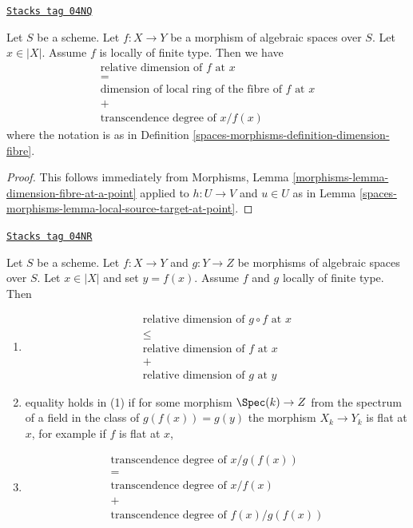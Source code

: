 \begin{lemma}
\label{spaces-morphisms-lemma-dimension-fibre-at-a-point}
\href{https://stacks.math.columbia.edu/tag/04NQ}{\texttt{Stacks tag 04NQ}}

Let $S$ be a scheme.
Let $f : X \to Y$ be a morphism of algebraic spaces over $S$.
Let $x \in |X|$.
Assume $f$ is locally of finite type.
Then we have
$$
\begin{matrix}
\text{relative dimension of }f\text{ at }x \\
= \\
\text{dimension of local ring of the fibre of }f\text{ at }x \\
+ \\
\text{transcendence degree of }x/f(x)
\end{matrix}
$$
where the notation is as in
Definition \ref{spaces-morphisms-definition-dimension-fibre}.
\end{lemma}

\begin{proof}
This follows immediately from
Morphisms, Lemma \ref{morphisms-lemma-dimension-fibre-at-a-point}
applied to $h : U \to V$ and $u \in U$
as in
Lemma \ref{spaces-morphisms-lemma-local-source-target-at-point}.
\end{proof}

\begin{lemma}
\label{spaces-morphisms-lemma-dimension-fibre-at-a-point-additive}
\href{https://stacks.math.columbia.edu/tag/04NR}{\texttt{Stacks tag 04NR}}

Let $S$ be a scheme.
Let $f : X \to Y$ and $g : Y \to Z$ be morphisms of algebraic spaces over $S$.
Let $x \in |X|$ and set $y = f(x)$.
Assume $f$ and $g$ locally of finite type.
Then
\begin{enumerate}
\item
$$
\begin{matrix}
\text{relative dimension of }g \circ f\text{ at }x \\
\leq \\
\text{relative dimension of }f\text{ at }x \\
+ \\
\text{relative dimension of }g\text{ at }y
\end{matrix}
$$
\item equality holds in (1) if for some morphism $\Spec(k) \to Z$
from the spectrum of a field in the class of $g(f(x)) = g(y)$
the morphism $X_k \to Y_k$ is flat at $x$, for example if $f$ is flat at $x$,
\item
$$
\begin{matrix}
\text{transcendence degree of }x/g(f(x)) \\
= \\
\text{transcendence degree of }x/f(x) \\
+ \\
\text{transcendence degree of }f(x)/g(f(x))
\end{matrix}
$$
\end{enumerate}
\end{lemma}

